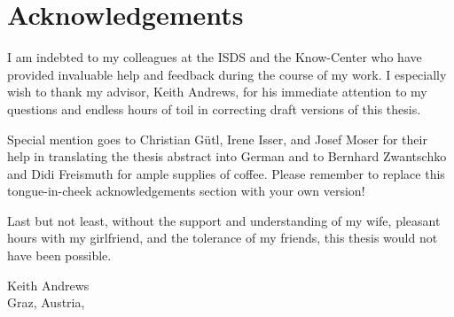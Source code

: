 %
%
% 
% 
% 


\chapter*{Acknowledgements}


I am indebted to my colleagues at the ISDS and the Know-Center who
have provided invaluable help and feedback during the course of my
work.
%
I especially wish to thank my advisor, Keith Andrews, for his
immediate attention to my questions and endless hours of toil in
correcting draft versions of this thesis.

Special mention goes to
Christian Gütl,
Irene Isser, and
Josef Moser
for their help in translating the thesis abstract into German
and to
Bernhard Zwantschko and Didi Freismuth for ample supplies of coffee.
%
Please remember to replace this tongue-in-cheek acknowledgements
section with your own version!


Last but not least, without the support and understanding of my wife,
pleasant hours with my girlfriend, and the tolerance of my friends,
this thesis would not have been possible.

\vspace{2cm}


\begin{flushright}
Keith Andrews \\[1ex]
{\small Graz, Austria, \thisdate}
\end{flushright}

